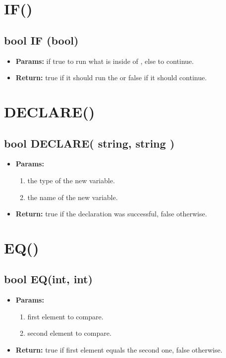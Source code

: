 \documentclass[11pt,a4paper]{article}
\begin{document}
\section*{IF(){}}
\begin{framed}
\subsection*{bool IF (bool)}
\begin{itemize}
\item \textbf{Params:} if true to run what is inside of {}, else to continue.
\item \textbf{Return:} true if it should run the {} or false if it should continue.
\end{itemize}
\end{framed}

\section*{DECLARE()}
\begin{framed}
\subsection*{bool DECLARE( string, string )}
\begin{itemize}
\item \textbf{Params:}
\begin{enumerate}
\item the type of the new variable.
\item the name of the new variable.
\end{enumerate}
\item \textbf{Return:} true if the declaration was successful, false otherwise.
\end{itemize}
\end{framed}

\section*{EQ()}
\begin{framed}
\subsection*{bool EQ(int, int)}
\begin{itemize}
\item \textbf{Params:}
\begin{enumerate}
\item first element to compare.
\item second element to compare.
\end{enumerate}
\item \textbf{Return:} true if first element equals the second one, false otherwise.
\end{itemize}
\end{framed}
\end{document}
